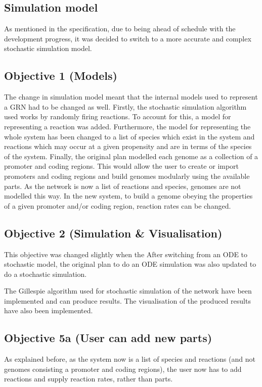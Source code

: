 \documentclass{article}
\begin{document}
	
	\subsection{Simulation model} 
	As mentioned in the specification, due to being ahead of schedule with the development progress, it was decided to switch to a more accurate and complex stochastic simulation model. 
	
	\subsection{Objective 1 (Models)}  
	The change in simulation model meant that the internal models used to represent a GRN had to be changed as well. Firstly, the stochastic simulation algorithm used works by randomly firing reactions. To account for this, a model for representing a reaction was added. Furthermore, the model for representing the whole system has been changed to a list of species which exist in the system and reactions which may occur at a given propensity and are in terms of the species of the system. Finally, the original plan modelled each genome as a collection of a promoter and coding regions. This would allow the user to create or import promoters and coding regions and build genomes modularly using the available parts. As the network is now a list of reactions and species, genomes are not modelled this way. In the new system, to build a genome obeying the properties of a given promoter and/or coding region, reaction rates can be changed.
	
	\subsection{Objective 2 (Simulation \& Visualisation)} 
	
	This objective was changed slightly when the 
	After switching from an ODE to stochastic model, the original plan to do an ODE simulation was also updated to do a stochastic simulation. 
	
	The Gillespie algorithm used for stochastic simulation of the network have been implemented and can produce results. The visualisation of the produced results have also been implemented.
	
	\subsection{Objective 5a (User can add new parts)} 
	As explained before, as the system now is a list of species and reactions (and not genomes consisting a promoter and coding regions), the user now has to add reactions and supply reaction rates, rather than parts.
	
\end{document}
